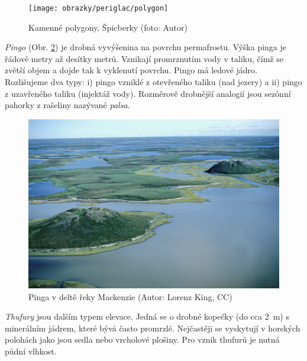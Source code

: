 \begin{figure}
	\centering
	\texttt{[image: obrazky/periglac/polygon]}
	\caption{Kamenné polygony, Špicberky (foto: Autor)}
	\label{fig:strukturni_polygon}
\end{figure}

\emph{Pingo} (Obr. \ref{fig:pingo}) je drobná vyvýšenina na povrchu permafrostu. Výška pinga je řádově metry až desítky metrů.  Vznikají promrznutím vody v taliku, čímž se zvětší objem a dojde tak k vyklenutí povrchu. Pingo má ledové jádro. Rozlišujeme dva typy: i) pingo vzniklé z otevřeného taliku (nad jezery) a ii) pingo z uzavřeného taliku (injektáž vody). Rozměrově drobnější analogií jsou sezónní pahorky z rašeliny nazývané \emph{palsa}.

\begin{figure}[t]
	\centering
	\includegraphics[width=1\linewidth]{obrazky/periglac/pingo_mackenzie}
	\caption{Pinga v deltě řeky Mackenzie (Autor: Lorenz King, CC)}
	\label{fig:pingo}
\end{figure}

\emph{Thufury} jsou dalším typem elevace. Jedná se o drobné kopečky (do cca \SI{2}{\metre}) s minerálním jádrem, které bývá často promrzlé. Nejčastěji se vyskytují v horských polohách jako jsou sedla nebo vrcholové plošiny. Pro vznik thufurů je nutná půdní vlhkost. 

